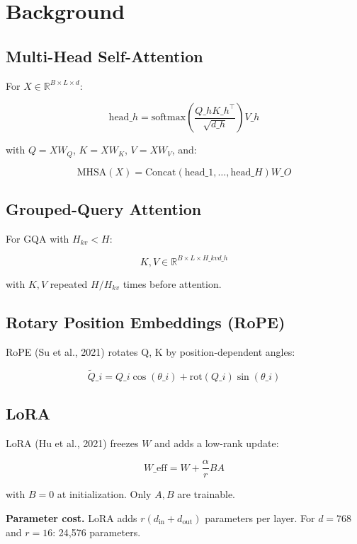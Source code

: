 
\section{Background}

\subsection{Multi-Head Self-Attention}

For $X \in \mathbb{R}^{B \times L \times d}$:

\[
\text{head}\_h = \text{softmax}\!\left(\frac{Q\_h K\_h^\top}{\sqrt{d\_h}}\right) V\_h
\tag{3.1}
\]

with $Q = X W_Q$, $K = X W_K$, $V = X W_V$, and:

\[
\text{MHSA}(X) = \text{Concat}(\text{head}\_1, \dots, \text{head}\_H) W\_O
\tag{3.2}
\]

\subsection{Grouped-Query Attention}

For GQA with $H_{kv} < H$:

\[
K, V \in \mathbb{R}^{B \times L \times H\_{kv} d\_h}
\tag{3.3}
\]

with $K, V$ repeated $H / H_{kv}$ times before attention.

\subsection{Rotary Position Embeddings (RoPE)}

RoPE (Su et al., 2021) rotates Q, K by position-dependent angles:

\[
\tilde{Q}\_i = Q\_i \cos(\theta\_i) + \text{rot}(Q\_i) \sin(\theta\_i)
\tag{3.4}
\]

\subsection{LoRA}

LoRA (Hu et al., 2021) freezes $W$ and adds a low-rank update:

\[
W\_\text{eff} = W + \frac{\alpha}{r} B A
\tag{3.5}
\]

with $B = 0$ at initialization. Only $A, B$ are trainable.

\textbf{Parameter cost.} LoRA adds $r(d_\text{in} + d_\text{out})$ parameters 
per layer. For $d = 768$ and $r = 16$: 24,576 parameters.

